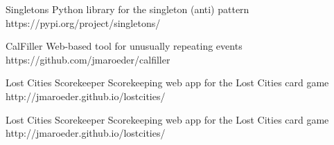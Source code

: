 



\begin{cvhonors}


\cvhonor
{Singletons} %
{Python library for the singleton (anti) pattern} %
{https://pypi.org/project/singletons/} %


\cvhonor
{CalFiller} %
{Web-based tool for unusually repeating events} %
{https://github.com/jmaroeder/calfiller} %


\cvhonor
{Lost Cities Scorekeeper} %
{Scorekeeping web app for the Lost Cities card game} %
{http://jmaroeder.github.io/lostcities/} %


\cvhonor
{Lost Cities Scorekeeper} %
{Scorekeeping web app for the Lost Cities card game} %
{http://jmaroeder.github.io/lostcities/} %





\end{cvhonors}
